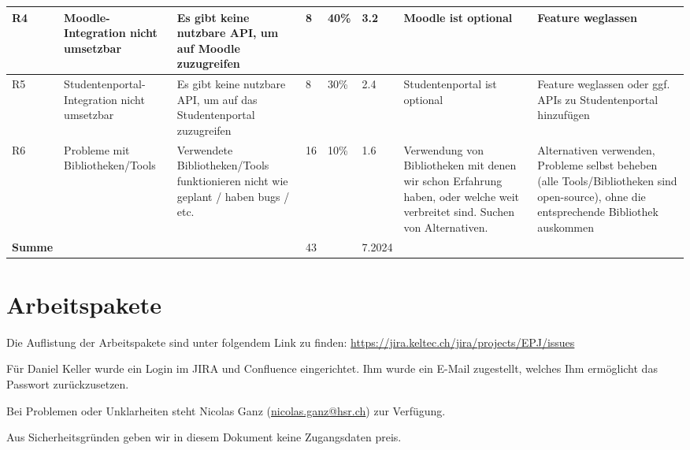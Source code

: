 \documentclass[a4paper]{article}
\let\oldsection\section
\renewcommand\section{\clearpage\oldsection}
\def\jiraurl{https://jira.keltec.ch/jira}
\begin{document}
\begin{landscape}
\begin{tabulary}{\linewidth}{lLLlLLLL}
    R4 & 
    Moodle-Integration nicht umsetzbar & 
    Es gibt keine nutzbare API, um auf Moodle zuzugreifen & 
    8 & 
    40\% & 
    3.2 & 
    Moodle ist optional & 
    Feature weglassen \\ \hline

    R5 & 
    Studenten\-portal-Integration nicht umsetzbar & 
    Es gibt keine nutzbare API, um auf das Studentenportal zuzugreifen & 
    8 & 
    30\% & 
    2.4 & 
    Studentenportal ist optional & 
    Feature weglassen oder ggf. APIs zu Studentenportal hinzufügen \\  \hline

    R6 &
    Probleme mit Bibliotheken/Tools &
    Verwendete Bibliotheken/Tools funktionieren nicht wie geplant / haben bugs / etc. &
    16 &
    10\% &
    1.6 &
    Verwendung von Bibliotheken mit denen wir schon Erfahrung haben, oder welche weit verbreitet sind. Suchen von Alternativen. &
    Alternativen verwenden, Probleme selbst beheben (alle Tools/Bibliotheken sind open-source), ohne die entsprechende Bibliothek auskommen \\ \midrule

    \textbf{Summe} & & & 43 & & 7.2024 & & \\
    \bottomrule
  \end{tabulary}
\end{landscape}
\restoregeometry

\section{Arbeitspakete}

Die Auflistung der Arbeitspakete sind unter folgendem Link zu finden: \url{\jiraurl/projects/EPJ/issues}

Für Daniel Keller wurde ein Login im JIRA und Confluence eingerichtet.
Ihm wurde ein E-Mail zugestellt, welches Ihm ermöglicht das Passwort zurückzusetzen.

Bei Problemen oder Unklarheiten steht Nicolas Ganz (\url{nicolas.ganz@hsr.ch}) zur Verfügung.

Aus Sicherheitsgründen geben wir in diesem Dokument keine Zugangsdaten preis.
\end{document}
